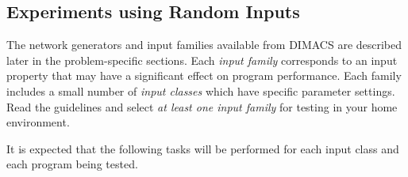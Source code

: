 \subsection{Experiments using Random Inputs} 

The network generators and input families available from DIMACS are
described later in the problem-specific sections.  Each {\em input
family} corresponds to an input property that may have a significant
effect on program performance.  Each family includes a small number of
{\em input classes} which have specific parameter settings.  Read the
guidelines and select {\em at least one input family} for testing in
your home environment.

It is expected that the following tasks will be performed for each
input class and each program being tested.

